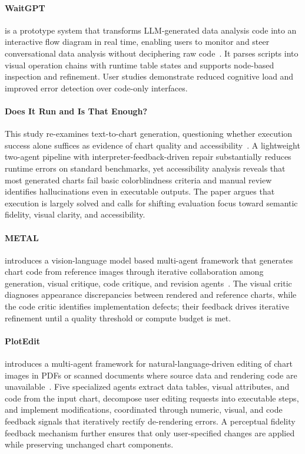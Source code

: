 \paragraph{WaitGPT}
 is a prototype system that transforms LLM-generated data analysis code into an interactive flow diagram in real time, enabling users to monitor and steer conversational data analysis without deciphering raw code~\cite{avg240801703}. It parses scripts into visual operation chains with runtime table states and supports node-based inspection and refinement. User studies demonstrate reduced cognitive load and improved error detection over code-only interfaces.

\paragraph{Does It Run and Is That Enough?}
This study re-examines text-to-chart generation, questioning whether execution success alone suffices as evidence of chart quality and accessibility~\cite{avg250606175}.  A lightweight two-agent pipeline with interpreter-feedback-driven repair substantially reduces runtime errors on standard benchmarks, yet accessibility analysis reveals that most generated charts fail basic colorblindness criteria and manual review identifies hallucinations even in executable outputs. The paper argues that execution is largely solved and calls for shifting evaluation focus toward semantic fidelity, visual clarity, and accessibility.

\paragraph{METAL}
 introduces a vision-language model based multi-agent framework that generates chart code from reference images through iterative collaboration among generation, visual critique, code critique, and revision agents~\cite{li2025metal}. The visual critic diagnoses appearance discrepancies between rendered and reference charts, while the code critic identifies implementation defects; their feedback drives iterative refinement until a quality threshold or compute budget is met.

\paragraph{PlotEdit}
 introduces a multi-agent framework for natural-language-driven editing of chart images in PDFs or scanned documents where source data and rendering code are unavailable~\cite{avg250111233}. Five specialized agents extract data tables, visual attributes, and code from the input chart, decompose user editing requests into executable steps, and implement modifications, coordinated through numeric, visual, and code feedback signals that iteratively rectify de-rendering errors. A perceptual fidelity feedback mechanism further ensures that only user-specified changes are applied while preserving unchanged chart components.


